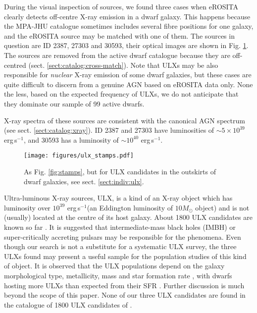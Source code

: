 \documentclass[fleqn,usenatbib]{mnras}
\newcommand{\ergps}{erg\,s$^{-1}$}
\newcommand{\msun}{M_\odot}
\newcommand{\mg}[1]{\textcolor{blue}{{MG: \bf||#1||}}}
\begin{document}
During the visual inspection of sources, we found three cases when eROSITA clearly detects off-centre X-ray emission in a dwarf galaxy.  This happens because the MPA-JHU catalogue sometimes includes  several fibre positions for one galaxy, and the eROSITA source may be matched with one of them.  The sources in question are ID 2387, 27303 and 30593, their optical images are shown in Fig. \ref{fig:stamps-ulx}. The sources are removed from the active dwarf catalogue because they are off-centred (sect. \ref{sect:catalog:cross-match}).  Note that ULXs may be also responsible for \textit{nuclear} X-ray emission of some dwarf galaxies, but these cases are quite difficult to discern from a genuine AGN based on eROSITA data only. None the less, based on the expected frequency of ULXs, we do not anticipate that they dominate our sample of 99 active dwarfs.  


X-ray spectra of these sources are consistent with the canonical AGN spectrum (see sect. \ref{sect:catalog:xray}). ID 2387 and 27303 have luminosities of $\sim5\times 10^{39}$ \ergps, and 30593 has a luminosity of $\sim10^{40}$ \ergps. %


\begin{figure*}
    \centering
    \texttt{[image: figures/ulx\_stamps.pdf]}
    \caption[As Fig. \ref{fig:stamps}, but for ULX candidates]{As Fig. \ref{fig:stamps}, but for ULX candidates in the outskirts of dwarf galaxies, see sect. \ref{sect:indiv:ulx}.}
    \label{fig:stamps-ulx}
\end{figure*}



Ultra-luminous X-ray sources, ULX,   \citep{Fabbiano1989, Swartz2004, Kaaret2017, Fabrika2021, King2023} is a kind of an X-ray object which has luminosity over $10^{39}$ \ergps (an Eddington luminosity of $10\msun$ object) and is not (usually) located at the centre of its host galaxy. About 1800 ULX candidates are known so far \citep{Walton2022}. It is suggested that intermediate-mass black holes (IMBH) or super-critically accreting pulsars may be responsible for the phenomena.  Even though our search is not  a substitute for a systematic  ULX survey, the three ULXs found may present a useful sample for the population studies of this kind of object. It is observed that the ULX populations depend on the galaxy morphological type, metallicity, mass and star formation rate \citep{Kovlakas2020}, with dwarfs hosting more ULXs than expected from their SFR \citep{Walton2011, Plotkin2014, Kovlakas2020}. Further discussion is much beyond the scope of this paper. None of our three ULX candidates are found in the catalogue of 1800 ULX candidates of  \citeauthor{Walton2022}.
\end{document}
